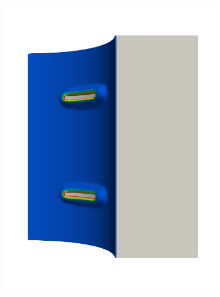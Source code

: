 \begin{frame}
\begin{columns}[T]
\begin{column}{0.6\textwidth}
\begin{figure}
{\begin{subfigure}{0.19\textwidth}
            \includegraphics[width=\textwidth]{examples/figures/seed_d_2}
          \end{subfigure}
          \hspace{0.06\textwidth}
          \begin{subfigure}{0.19\textwidth}
            \centering

\end{subfigure}}
\end{figure}
\end{column}
\end{columns}
\end{frame}
